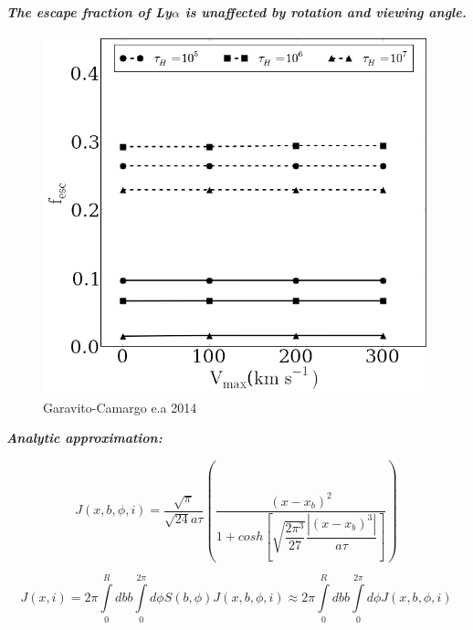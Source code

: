 \documentclass{beamer}
\begin{document}
\begin{frame}{\textit{\textbf{The escape fraction of Ly$\alpha$ is unaffected by rotation and viewing angle.}}}
\begin{figure}
\includegraphics[scale=0.30]{Figures/f10.png}
\caption*{Garavito-Camargo e.a 2014}
\end{figure}
\end{frame}

\begin{frame}{\textit{\textbf{Analytic approximation:}}}

\begin{equation}
J(x, b, \phi, i) = \dfrac{\sqrt{\pi}}{\sqrt{24}a\tau}\left( \dfrac{(x - x_b)^2}{1 + cosh[\sqrt{\dfrac{2\pi^3}{27}}\dfrac{|(x-x_b)^3|}{a\tau}]} \right ) 
\end{equation}


\begin{equation}
J(x, i) = 2\pi \int \limits_0^R db b \int \limits_0^{2\pi}d\phi S(b,\phi)J(x, b, \phi, i) \approx 2\pi \int \limits_0^R db b \int \limits_0^{2\pi}d\phi J(x, b, \phi, i)
\end{equation}
\end{frame}
\end{document}

